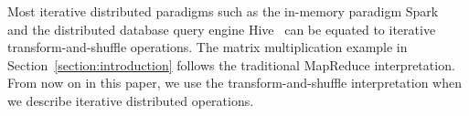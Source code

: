 \documentclass[10pt,journal,compsoc]{IEEEtran}
\begin{document}



Most iterative distributed paradigms such as the in-memory paradigm
Spark~\cite{zaharia2012resilient} and the distributed database query
engine Hive~\cite{thusoo2009hive} can be equated to iterative transform-and-shuffle operations.
The matrix multiplication example in Section~\ref{section:introduction}
follows the traditional MapReduce interpretation. 
From now on in this paper, we use the transform-and-shuffle interpretation when we describe iterative distributed operations.



\end{document}
